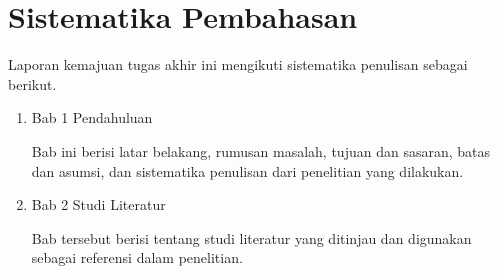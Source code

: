 \section{Sistematika Pembahasan}

Laporan kemajuan tugas akhir ini mengikuti sistematika penulisan sebagai berikut.

\begin{enumerate}
	\item Bab 1 Pendahuluan

	      Bab ini berisi latar belakang, rumusan masalah, tujuan dan sasaran, batas dan asumsi, dan sistematika penulisan dari penelitian yang dilakukan.

	\item Bab 2 Studi Literatur

	      Bab tersebut berisi tentang studi literatur yang ditinjau dan digunakan sebagai referensi dalam penelitian.

\end{enumerate}

